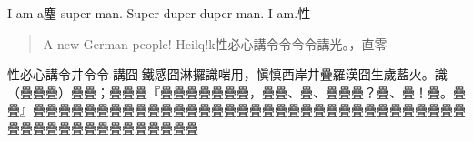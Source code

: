 \documentclass[a5paper,12pt]{article}
\newcommand*\CJKmovesymbol[1]{\raise0.5em\hbox{#1}}
\newcommand*\CJKmove{%

  \let\CJKpunctsymbol\CJKmovesymbol}
\begin{document}
I am a塵 super man. Super duper duper man. I am.性
\begin{quote}
A new German people! Heilq!k性必心講令令令令講光。，直零
\end{quote}

\begin{rotate}{-90}
\begin{minipage}{15em}

性必心講令井令令𠆭講囧𠞉鐵感囧淋攞識啱用，愼慎西岸井疊羅漢囧生歲藍火。識（疊疊疊）疊疊；疊疊疊『疊疊疊疊疊疊疊，疊疊、疊、疊疊疊？疊、疊！疊。疊疊』疊疊疊疊疊疊疊疊疊疊疊疊疊疊疊疊疊疊疊疊疊疊疊疊疊疊疊疊疊疊疊疊疊疊疊疊疊疊疊疊疊疊疊疊疊疊疊疊疊
%
\end{minipage}
\end{rotate}
\end{document}
